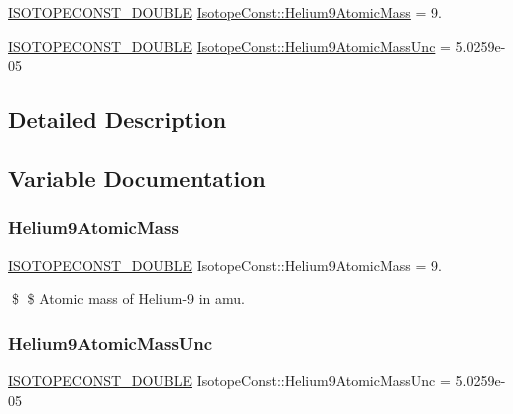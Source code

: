 \begin{DoxyCompactItemize}
\item 
\mbox{\hyperlink{group___isotope_const-_macros_ga8f45a7272ce02c0b4c65c44636ed719a}{I\+S\+O\+T\+O\+P\+E\+C\+O\+N\+S\+T\+\_\+\+D\+O\+U\+B\+LE}} \mbox{\hyperlink{group___isotope_const-_helium-_he9_gad5a4dba0ba662c269f1079a7a404ff3e}{Isotope\+Const\+::\+Helium9\+Atomic\+Mass}} = 9.
\item 
\mbox{\hyperlink{group___isotope_const-_macros_ga8f45a7272ce02c0b4c65c44636ed719a}{I\+S\+O\+T\+O\+P\+E\+C\+O\+N\+S\+T\+\_\+\+D\+O\+U\+B\+LE}} \mbox{\hyperlink{group___isotope_const-_helium-_he9_gae6cbfd17f17024e70f211eabaf5be8cb}{Isotope\+Const\+::\+Helium9\+Atomic\+Mass\+Unc}} = 5.\+0259e-\/05
\end{DoxyCompactItemize}


\subsection{Detailed Description}


\subsection{Variable Documentation}
\mbox{\label{group___isotope_const-_helium-_he9_gad5a4dba0ba662c269f1079a7a404ff3e}} 
\subsubsection{\texorpdfstring{Helium9\+Atomic\+Mass}{Helium9AtomicMass}}
{\footnotesize\ttfamily \mbox{\hyperlink{group___isotope_const-_macros_ga8f45a7272ce02c0b4c65c44636ed719a}{I\+S\+O\+T\+O\+P\+E\+C\+O\+N\+S\+T\+\_\+\+D\+O\+U\+B\+LE}} Isotope\+Const\+::\+Helium9\+Atomic\+Mass = 9.}

\$ \$ Atomic mass of Helium-\/9 in amu. \mbox{\label{group___isotope_const-_helium-_he9_gae6cbfd17f17024e70f211eabaf5be8cb}} 
\subsubsection{\texorpdfstring{Helium9\+Atomic\+Mass\+Unc}{Helium9AtomicMassUnc}}
{\footnotesize\ttfamily \mbox{\hyperlink{group___isotope_const-_macros_ga8f45a7272ce02c0b4c65c44636ed719a}{I\+S\+O\+T\+O\+P\+E\+C\+O\+N\+S\+T\+\_\+\+D\+O\+U\+B\+LE}} Isotope\+Const\+::\+Helium9\+Atomic\+Mass\+Unc = 5.\+0259e-\/05}

